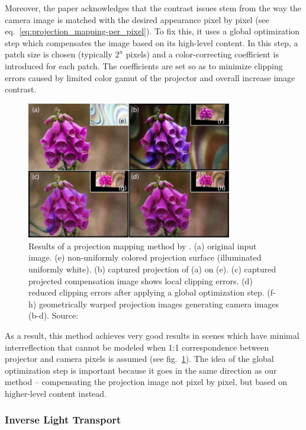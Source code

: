 Moreover, the paper acknowledges that the contrast issues stem from the way the camera image is matched with the desired appearance pixel by pixel (see eq.~\ref{eq:projection_mapping-per_pixel}). To fix this, it uses a global optimization step which compensates the image based on its high-level content. In this step, a patch size is chosen (typically \(2^n\) pixels) and a color-correcting coefficient is introduced for each patch. The coefficients are set so as to minimize clipping errors caused by limited color gamut of the projector and overall increase image contrast.

\begin{figure}
    \centering
    \includegraphics[width=0.8\textwidth]{images/02-grundhofer_result.jpg}
    \caption{Results of a projection mapping method by \citet{Grundhofer2015}. (a) original input image. (e) non-uniformly colored projection surface (illuminated  uniformly white). (b) captured projection of (a) on (e). (c) captured  projected  compensation  image shows local clipping errors. (d) reduced clipping errors after applying a global optimization step. (f-h) geometrically warped projection images generating camera images (b-d). Source: \citet{Grundhofer2015}}
    \label{fig:background_grundhofer_result}
\end{figure}

As a result, this method achieves very good results in scenes which have minimal interreflection that cannot be modeled when 1:1 correspondence between projector and camera pixels is assumed (see fig.~\ref{fig:background_grundhofer_result}). The idea of the global optimization step is important because it goes in the same direction as our method -- compensating the projection image not pixel by pixel, but based on higher-level content instead.

\subsubsection{Inverse Light Transport}
\label{section:background-projection_mapping-procams-inverse_lt}

